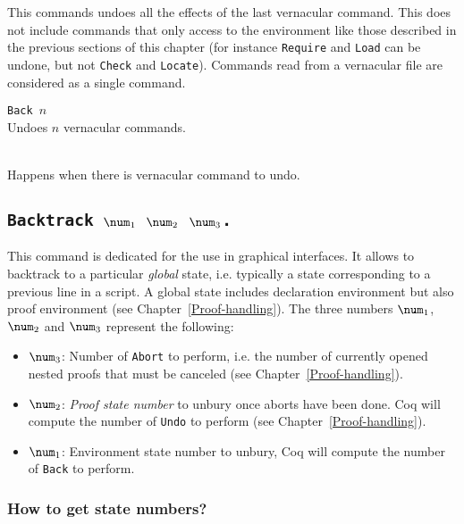 This commands undoes all the effects of the last vernacular
command. This does not include commands that only access to the
environment like those described in the previous sections of this
chapter (for instance {\tt Require} and {\tt Load} can be undone, but
not {\tt Check} and {\tt Locate}). Commands read from a vernacular
file are considered as a single command.

\begin{Variants}
\item {\tt Back $n$} \\
  Undoes $n$ vernacular commands.
\end{Variants}

\begin{ErrMsgs}
\item {} \\
  Happens when there is vernacular command to undo.
\end{ErrMsgs}

\subsection[\tt Backtrack $\num_1$ $\num_2$ $\num_3$.]{\tt Backtrack $\num_1$ $\num_2$ $\num_3$.}

This command is dedicated for the use in graphical interfaces.  It
allows to backtrack to a particular \emph{global} state, i.e.
typically a state corresponding to a previous line in a script. A
global state includes declaration environment but also proof
environment (see Chapter~\ref{Proof-handling}). The three numbers
$\num_1$, $\num_2$ and $\num_3$ represent the following:
\begin{itemize}
\item $\num_3$: Number of \texttt{Abort} to perform, i.e. the number
  of currently opened nested proofs that must be canceled (see
  Chapter~\ref{Proof-handling}).
\item $\num_2$: \emph{Proof state number} to unbury once aborts have
  been done. Coq will compute the number of \texttt{Undo} to perform
  (see Chapter~\ref{Proof-handling}).
\item $\num_1$: Environment state number to unbury, Coq will compute
  the number of \texttt{Back} to perform.
\end{itemize}


\subsubsection{How to get state numbers?}
\label{sec:statenums}


